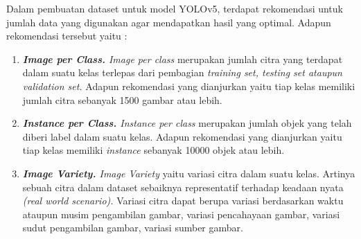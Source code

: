 Dalam pembuatan dataset untuk model YOLOv5, terdapat rekomendasi untuk jumlah data yang digunakan agar mendapatkan hasil yang optimal. Adapun rekomendasi tersebut yaitu \citep{ultralyticsyolo}:
\begin{enumerate}[nolistsep]
    \item \textit{\textbf{Image per Class.} Image per class} merupakan jumlah citra yang terdapat dalam suatu kelas terlepas dari pembagian \textit{training set, testing set \textnormal{ataupun} validation set.} Adapun rekomendasi yang dianjurkan yaitu tiap kelas memiliki jumlah citra sebanyak 1500 gambar atau lebih.
    \item \textit{\textbf{Instance per Class.} Instance per class} merupakan jumlah objek yang telah diberi label dalam suatu kelas. Adapun rekomendasi yang dianjurkan yaitu tiap kelas memiliki \textit{instance} sebanyak 10000 objek atau lebih.
    \item \textit{\textbf{Image Variety.} Image Variety} yaitu variasi citra dalam suatu kelas. Artinya sebuah citra dalam dataset sebaiknya representatif terhadap keadaan nyata \textit{(real world scenario).} Variasi citra dapat berupa variasi berdasarkan waktu ataupun musim pengambilan gambar, variasi pencahayaan gambar, variasi sudut pengambilan gambar, variasi sumber gambar.
\end{enumerate}
